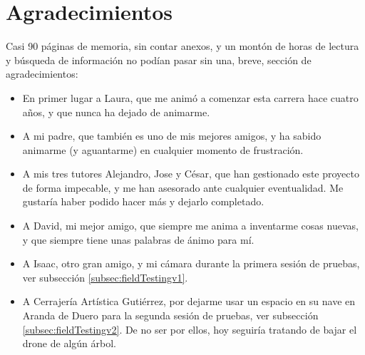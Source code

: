 \section{Agradecimientos}
\label{sec:agradecimientos}

Casi 90 páginas de memoria, sin contar anexos, y un montón de horas de lectura y búsqueda de información no podían pasar sin una, breve, sección de agradecimientos: 

\begin{itemize}
\item En primer lugar a Laura, que me animó a comenzar esta carrera hace cuatro años, y que nunca ha dejado de animarme.
\item A mi padre, que también es uno de mis mejores amigos, y ha sabido animarme (y aguantarme) en cualquier momento de frustración. 
\item A mis tres tutores Alejandro, Jose y César, que han gestionado este proyecto de forma impecable, y me han asesorado ante cualquier eventualidad. Me gustaría haber podido hacer más y dejarlo completado.
\item A David, mi mejor amigo, que siempre me anima a inventarme cosas nuevas, y que siempre tiene unas palabras de ánimo para mí. 
\item A Isaac, otro gran amigo, y mi cámara durante la primera sesión de pruebas, ver subsección \ref{subsec:fieldTestingv1}.
\item A Cerrajería Artística Gutiérrez, por dejarme usar un espacio en su nave en Aranda de Duero para la segunda sesión de pruebas, ver subsección \ref{subsec:fieldTestingv2}. De no ser por ellos, hoy seguiría tratando de bajar el drone de algún árbol.
\end{itemize}

















